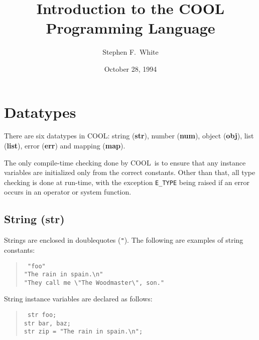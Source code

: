 
\newcommand{\hdr}[1]{\begin{center} \Large #1 \end{center}}
\newcommand{\func}[1]{\tt #1}
\newcommand{\funcarg}[1]{\tt \it #1}
\newcommand{\keyword}[1]{\tt #1}
\newcommand{\error}[1]{\tt #1}
\newcommand{\COOLMUD}[0]{{\small COOLMUD}}
\newcommand{\COOL}[0]{{\small COOL}}
\newenvironment{code}{\begin{quote} \tt }{\end{quote}}
\newcommand{\ind}{\hspace*{1em}}
\title{Introduction to the COOL Programming Language}
\author{Stephen F.\ White}
\date{October 28, 1994}
\setlength{\parindent}{0pt}
\setlength{\parskip}{2ex plus 2pt minus 1pt}
\maketitle

\section{Datatypes}

There are six datatypes in \COOL: string ({\bf str}), number ({\bf num}), object
({\bf obj}), list ({\bf list}), error ({\bf err}) and mapping ({\bf map}).

The only compile-time checking done by \COOL\ is to ensure that
any instance variables are initialized only from the correct
constants.  Other than that, all type checking is done at run-time,
with the exception {\error E\_TYPE} being raised if an error occurs in an
operator or system function.

\subsection{String ({\bf str})}

Strings are enclosed in doublequotes (\verb+"+).
The following are examples of string constants:
\begin{code}
"foo" \\
"The rain in spain.\verb+\+n" \\
"They call me \verb+\+"The Woodmaster\verb+\+", son."
\end{code}
String instance variables are declared as follows:
\begin{code}
str foo; \\
str bar, baz; \\ 
str zip = "The rain in spain.\verb+\+n";
\end{code}

